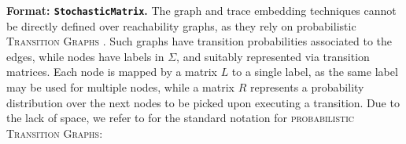 \textbf{Format: \texttt{StochasticMatrix}.} %
The graph and trace embedding techniques %
cannot be directly defined over reachability graphs, as they %
rely on probabilistic \textsc{Transition Graphs} \cite{GartnerFW03}. Such graphs have transition probabilities associated to the edges, while nodes have labels in $\Sigma$, 
and suitably represented via transition matrices. Each node is mapped by a matrix $L$ to a single label, as the same label may be used for multiple nodes, while a matrix $R$ represents a probability distribution over the next nodes to be picked upon executing a transition.
Due to the lack of space, we refer to \cite{GartnerFW03} for the standard notation for \textsc{probabilistic Transition Graphs}:
